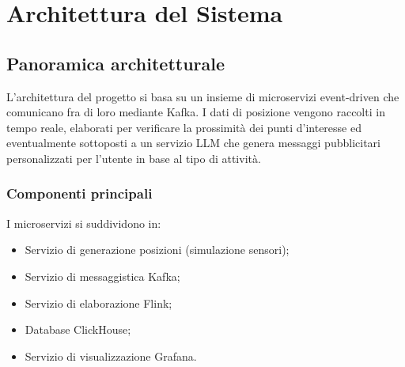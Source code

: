 \documentclass[10pt]{article}
\newcommand{\myparagraph}[1]{\paragraph{#1}\mbox{}\\}
\begin{document}
    
    
    

\section{Architettura del Sistema}

\subsection{Panoramica architetturale}
L'architettura del progetto si basa su un insieme di microservizi event-driven che comunicano fra di loro mediante Kafka. I dati di posizione vengono raccolti in tempo reale, elaborati per verificare la prossimità dei punti d'interesse ed eventualmente sottoposti a un servizio LLM che genera messaggi pubblicitari personalizzati per l'utente in base al tipo di attività.

\subsubsection{Componenti principali}
I microservizi si suddividono in:
\begin{itemize}
    \item Servizio di generazione posizioni (simulazione sensori);
    \item Servizio di messaggistica Kafka;
    \item Servizio di elaborazione Flink;
    \item Database ClickHouse;
    \item Servizio di visualizzazione Grafana.
\end{itemize}
\end{document}

